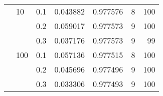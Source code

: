 \begin{table}[H]
\begin{tabular}{lllrrrr}
       & 10  & 0.1 &  0.043882 &  0.977576 &       8 &   100 \\
       &     & 0.2 &  0.059017 &  0.977573 &       9 &   100 \\
       &     & 0.3 &  0.037176 &  0.977573 &       9 &    99 \\
       & 100 & 0.1 &  0.057136 &  0.977515 &       8 &   100 \\
       &     & 0.2 &  0.045696 &  0.977496 &       9 &   100 \\
       &     & 0.3 &  0.033306 &  0.977493 &       9 &   100 \\
\bottomrule
\end{tabular}
\end{table}
